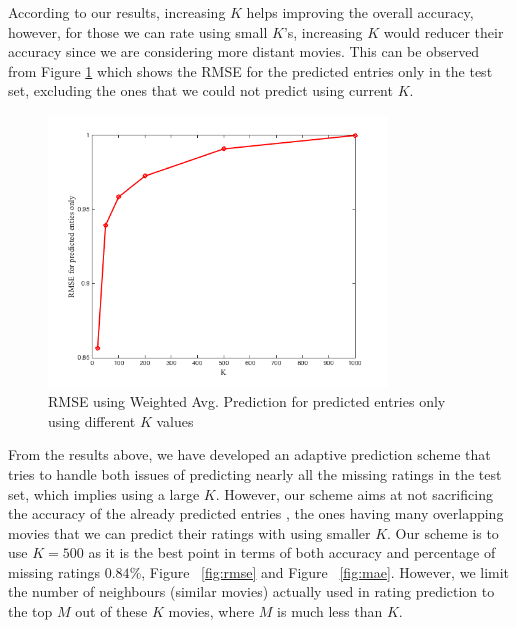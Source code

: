 According to our results, increasing $K$ helps improving the overall accuracy, however, for those we can rate using small $K$'s, increasing $K$ would reducer their accuracy since we are considering more distant movies. This can be observed from Figure \ref{fig:rmsepred} which shows the RMSE for the predicted entries only in the test set, excluding the ones that we could not predict using current $K$.
\begin{figure}[!ht]
  \centering
  \includegraphics[width=0.8\textwidth]{images/rmsep.png}
  \caption{RMSE using Weighted Avg. Prediction for predicted entries only using different $K$ values}
  \label{fig:rmsepred}
\end{figure}

From the results above, we have developed an adaptive prediction scheme that tries to handle both issues of predicting nearly all the missing ratings in the test set, which implies using a large $K$. However, our scheme aims at not sacrificing the accuracy of the already predicted entries , the ones having many overlapping movies that we can predict their ratings with using smaller $K$. Our scheme is to use $K=500$ as it is the best point in terms of both accuracy and percentage of missing ratings $0.84\%$, Figure ~\ref{fig:rmse} and Figure  ~\ref{fig:mae}. However, we limit the number of neighbours (similar movies) actually used in rating prediction to the top $M$ out of these $K$ movies, where $M$ is much less than $K$. \\

